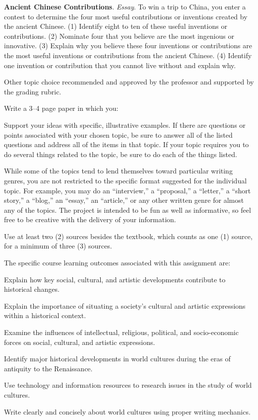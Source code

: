 \begin{enumerate*}
	\item \textbf{Ancient Chinese Contributions}. \emph{Essay}. To win a trip to China, you enter a contest to determine the four most useful contributions or inventions created by the ancient Chinese. (1) Identify eight to ten of these useful inventions or contributions. (2) Nominate four that you believe are the most ingenious or innovative. (3) Explain why you believe these four inventions or contributions are the most useful inventions or contributions from the ancient Chinese. (4) Identify one invention or contribution that you cannot live without and explain why.

	\item Other topic choice recommended and approved by the professor and supported by the grading rubric.
\end{enumerate*}

Write a 3--4 page paper in which you:
\begin{itemize*}
	\item Support your ideas with specific, illustrative examples. If there are questions or points associated with your chosen topic, be sure to answer all of the listed questions and address all of the items in that topic. If your topic requires you to do several things related to the topic, be sure to do each of the things listed.
	\item While some of the topics tend to lend themselves toward particular writing genres, you are not restricted to the specific format suggested for the individual topic. For example, you may do an ``interview,'' a ``proposal,'' a ``letter,'' a ``short story,'' a ``blog,'' an ``essay,'' an ``article,'' or any other written genre for almost any of the topics. The project is intended to be fun as well as informative, so feel free to be creative with the delivery of your information.
	\item Use at least two (2) sources besides the textbook, which counts as one (1) source, for a minimum of three (3) sources.
\end{itemize*}

The specific course learning outcomes associated with this assignment are:
\begin{itemize*}
	\item Explain how key social, cultural, and artistic developments contribute to historical changes.
	\item Explain the importance of situating a society's cultural and artistic expressions within a historical context.
	\item Examine the influences of intellectual, religious, political, and socio-economic forces on social, cultural, and artistic expressions.
	\item Identify major historical developments in world cultures during the eras of antiquity to the Renaissance.
	\item Use technology and information resources to research issues in the study of world cultures.
	\item Write clearly and concisely about world cultures using proper writing mechanics.
\end{itemize*}

